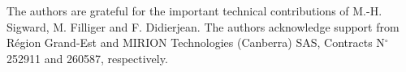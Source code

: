 %
%
\begin{acknowledgement}
\label{sec:acknowledgements}
The authors are grateful for the important technical contributions of M.-H. Sigward, M. Filliger and F. Didierjean. The authors acknowledge support from Région Grand-Est and MIRION Technologies (Canberra) SAS, Contracts N$^\circ$\,252911 and 260587, respectively.
\end{acknowledgement}

\FloatBarrier
%





